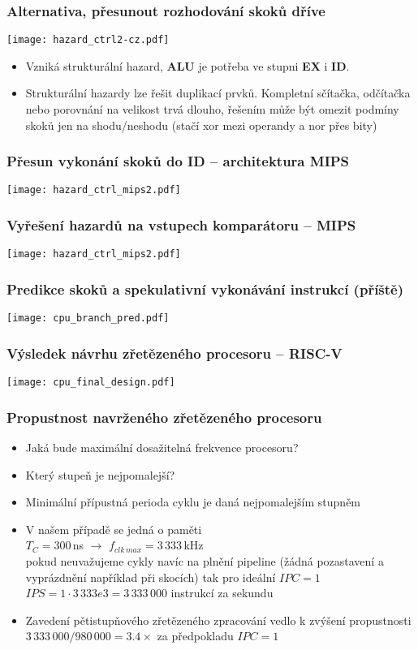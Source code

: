 \documentclass{beamer}
\begin{document}
\begin{frame}
\frametitle{Alternativa, přesunout rozhodování skoků dříve}
\texttt{[image: hazard\_ctrl2-cz.pdf]}

\begin{itemize}
 \item Vzniká strukturální hazard, \textbf{ALU} je potřeba ve stupni \textbf{EX} i \textbf{ID}.
 \item Strukturální hazardy lze řešit duplikací prvků. Kompletní sčítačka, odčítačka nebo porovnání
       na velikost trvá dlouho, řešením může být omezit podmíny skoků jen na shodu/neshodu (stačí xor
       mezi operandy a nor přes bity)
\end{itemize}

\end{frame}

\begin{frame}
\frametitle{Přesun vykonání skoků do ID -- architektura MIPS}
\texttt{[image: hazard\_ctrl\_mips2.pdf]}
\end{frame}

\begin{frame}
\frametitle{Vyřešení hazardů na vstupech komparátoru -- MIPS}
\texttt{[image: hazard\_ctrl\_mips2.pdf]}
\end{frame}

\begin{frame}
\frametitle{Predikce skoků a spekulativní vykonávání instrukcí (příště)}
\texttt{[image: cpu\_branch\_pred.pdf]}
\end{frame}

\begin{frame}
\frametitle{Výsledek návrhu zřetězeného procesoru -- RISC-V}
\texttt{[image: cpu\_final\_design.pdf]}
\end{frame}

\begin{frame}
\frametitle{Propustnost navrženého zřetězeného procesoru}

\begin{itemize}
 \item Jaká bude maximální dosažitelná frekvence procesoru?
 \item Který stupeň je nejpomalejší?
 \item Minimální přípustná perioda cyklu je daná nejpomalejším stupněm
 \item V našem případě se jedná o paměti \\
       $T_C = 300$\,ns $\rightarrow$ $f_{clk\,max} = 3\,333$\,kHz \\
       pokud neuvažujeme cykly navíc na plnění pipeline (žádná pozastavení
       a vyprázdnění například při skocích) tak pro ideální $IPC = 1$ \\
       $IPS = 1 \cdot 3\,333e3 = 3\,333\,000$ instrukcí za sekundu
 \item Zavedení pětistupňového zřetězeného zpracování vedlo k zvýšení
       propustnosti $3\,333\,000 / 980\,000 = 3.4 \times$ za předpokladu $IPC = 1$
\end{itemize}

\end{frame}
\end{document}

